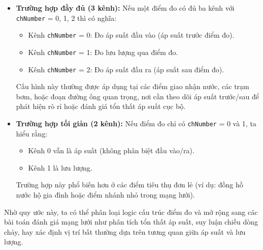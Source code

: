 \begin{itemize}
    \item \textbf{Trường hợp đầy đủ (3 kênh):} Nếu một điểm đo có đủ ba kênh với \texttt{chNumber} = 0, 1, 2 thì có nghĩa:
    \begin{itemize}
        \item Kênh \texttt{chNumber} = 0: Đo áp suất đầu vào (áp suất trước điểm đo).
        \item Kênh \texttt{chNumber} = 1: Đo lưu lượng qua điểm đo.
        \item Kênh \texttt{chNumber} = 2: Đo áp suất đầu ra (áp suất sau điểm đo).
    \end{itemize}
    Cấu hình này thường được áp dụng tại các điểm giao nhận nước, các trạm bơm, hoặc đoạn đường ống quan trọng, nơi cần theo dõi áp suất trước/sau để phát hiện rò rỉ hoặc đánh giá tổn thất áp suất cục bộ.
    
    \item \textbf{Trường hợp tối giản (2 kênh):} Nếu điểm đo chỉ có \texttt{chNumber} = 0 và 1, ta hiểu rằng:
    \begin{itemize}
        \item Kênh 0 vẫn là áp suất (không phân biệt đầu vào/ra).
        \item Kênh 1 là lưu lượng.
    \end{itemize}
    Trường hợp này phổ biến hơn ở các điểm tiêu thụ đơn lẻ (ví dụ: đồng hồ nước hộ gia đình hoặc điểm nhánh nhỏ trong mạng lưới).
\end{itemize}

Nhờ quy ước này, ta có thể phân loại logic cấu trúc điểm đo và mở rộng sang các bài toán đánh giá mạng lưới như phân tích tổn thất áp suất, suy luận chiều dòng chảy, hay xác định vị trí bất thường dựa trên tương quan giữa áp suất và lưu lượng.





